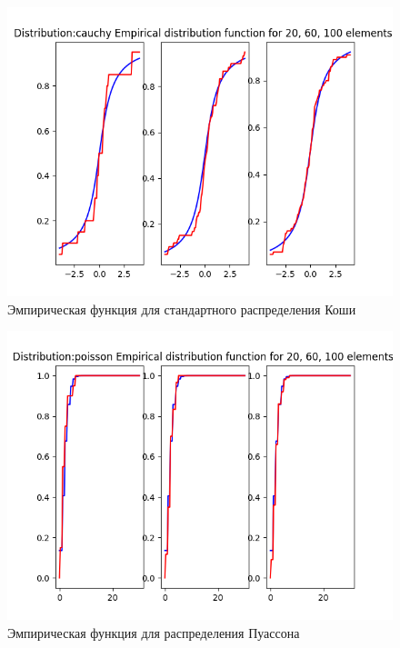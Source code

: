\documentclass[12pt]{report}
\begin{document}
\begin{center}
\begin{figure}[H]
\caption{Эмпирическая функция для стандартного распределения Коши }
\includegraphics[width=\textwidth]{../lab_4/pic/empiric/cauchy.png} 
\end{figure}

\begin{figure}[H]
\caption{Эмпирическая функция для распределения Пуассона }
\includegraphics[width=\textwidth]{../lab_4/pic/empiric/poisson.png} 
\end{figure}


\end{center}
\end{document}
